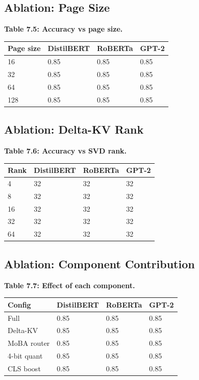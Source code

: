 \subsection{Ablation: Page Size}

\textbf{Table 7.5: Accuracy vs page size.}

\begin{table}[H]
\centering
\small
\begin{tabular}{llll}
\toprule
\textbf{Page size} & \textbf{DistilBERT} & \textbf{RoBERTa} & \textbf{GPT-2} \\
\midrule
16 & 0.85 & 0.85 & 0.85 \\
32 & 0.85 & 0.85 & 0.85 \\
64 & 0.85 & 0.85 & 0.85 \\
128 & 0.85 & 0.85 & 0.85 \\
\bottomrule
\end{tabular}
\end{table}

\subsection{Ablation: Delta-KV Rank}

\textbf{Table 7.6: Accuracy vs SVD rank.}

\begin{table}[H]
\centering
\small
\begin{tabular}{llll}
\toprule
\textbf{Rank} & \textbf{DistilBERT} & \textbf{RoBERTa} & \textbf{GPT-2} \\
\midrule
4 & 32 & 32 & 32 \\
8 & 32 & 32 & 32 \\
16 & 32 & 32 & 32 \\
32 & 32 & 32 & 32 \\
64 & 32 & 32 & 32 \\
\bottomrule
\end{tabular}
\end{table}

\subsection{Ablation: Component Contribution}

\textbf{Table 7.7: Effect of each component.}

\begin{table}[H]
\centering
\small
\begin{tabular}{llll}
\toprule
\textbf{Config} & \textbf{DistilBERT} & \textbf{RoBERTa} & \textbf{GPT-2} \\
\midrule
Full & 0.85 & 0.85 & 0.85 \\
Delta-KV & 0.85 & 0.85 & 0.85 \\
MoBA router & 0.85 & 0.85 & 0.85 \\
4-bit quant & 0.85 & 0.85 & 0.85 \\
CLS boost & 0.85 & 0.85 & 0.85 \\
\bottomrule
\end{tabular}
\end{table}


